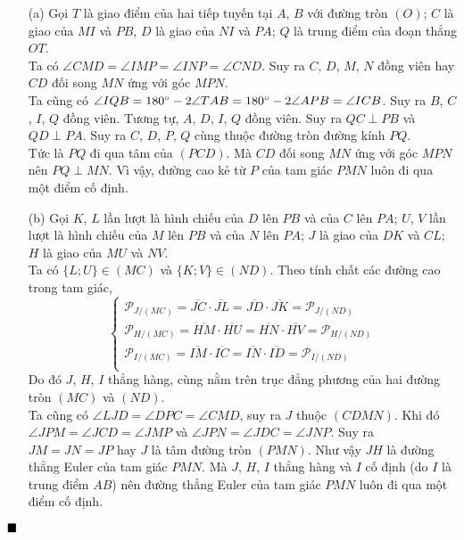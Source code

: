 \documentclass{article} %
\newenvironment{solution}[1][Lời giải]{%
  \proof[\faPenNib \hspace{0.2cm} \ttfamily \scshape \large #1]%
}{\(\hfill \blacksquare\){\parfillskip0pt\par}}
\begin{document}
        \begin{solution}
            \hfill
            \begin{enumerate}
                \item[(a)] Gọi \(T\) là giao điểm của hai tiếp tuyến tại \(A\), \(B\) với đường tròn \((O)\); \(C\) là giao của \(MI\) và \(PB\), \(D\) là giao của \(NI\) và \(PA\); \(Q\) là trung điểm của đoạn thẳng \(OT\).\\
                Ta có \(\angle CMD = \angle IMP = \angle INP = \angle CND\). Suy ra \(C\), \(D\), \(M\), \(N\) đồng viên hay \(CD\) đối song \(MN\) ứng với góc \(MPN\).\\
                Ta cũng có \(\angle IQB = 180 \degree - 2 \angle TAB = 180 \degree - 2 \angle APB = \angle ICB\). Suy ra \(B\), \(C\), \(I\), \(Q\) đồng viên. Tương tự, \(A\), \(D\), \(I\), \(Q\) đồng viên. Suy ra \(QC \perp PB\) và \(QD \perp PA\). Suy ra  \(C\), \(D\), \(P\), \(Q\) cùng thuộc đường tròn đường kính \(PQ\).\\
                Tức là \(PQ\) đi qua tâm của \((PCD)\). Mà \(CD\) đối song \(MN\) ứng với góc \(MPN\) nên \(PQ \perp MN\). Vì vậy, đường cao kẻ từ \(P\) của tam giác \(PMN\) luôn đi qua một điểm cố định.
                \item[(b)] Gọi \(K\), \(L\) lần lượt là hình chiếu của \(D\) lên \(PB\) và của \(C\) lên \(PA\); \(U\), \(V\) lần lượt là hình chiếu của \(M\) lên \(PB\) và của \(N\) lên \(PA\); \(J\) là giao của \(DK\) và \(CL\); \(H\) là giao của \(MU\) và \(NV\).\\
                Ta có \(\{L; U\} \in (MC)\) và \(\{K; V\} \in (ND)\). Theo tính chất các đường cao trong tam giác,
                \[\left\{\begin{array}{lcl}
                     \mathcal{P}_{J/(MC)} = \overline{JC} \cdot \overline{JL} = \overline{JD} \cdot \overline{JK} = \mathcal{P}_{J/(ND)} \\
                     \mathcal{P}_{H/(MC)} = \overline{HM} \cdot \overline{HU} = \overline{HN} \cdot \overline{HV} = \mathcal{P}_{H/(ND)} \\
                     \mathcal{P}_{I/(MC)} = \overline{IM} \cdot \overline{IC} = \overline{IN} \cdot \overline{ID} = \mathcal{P}_{I/(ND)} \\
                \end{array}\right.\]
                Do đó \(J\), \(H\), \(I\) thẳng hàng, cùng nằm trên trục đẳng phương của hai đường tròn \((MC)\) và \((ND)\).\\
                Ta cũng có \(\angle LJD = \angle DPC = \angle CMD\), suy ra \(J\) thuộc \((CDMN)\). Khi đó \(\angle JPM = \angle JCD = \angle JMP\) và \(\angle JPN = \angle JDC = \angle JNP\). Suy ra \(JM = JN = JP\) hay \(J\) là tâm đường tròn \((PMN)\). Như vậy \(JH\) là đường thẳng Euler của tam giác \(PMN\). Mà \(J\), \(H\), \(I\) thẳng hàng và \(I\) cố định (do \(I\) là trung điểm \(AB\)) nên đường thẳng Euler của tam giác \(PMN\) luôn đi qua một điểm cố định.
            \end{enumerate}
        \end{solution}
\end{document}
